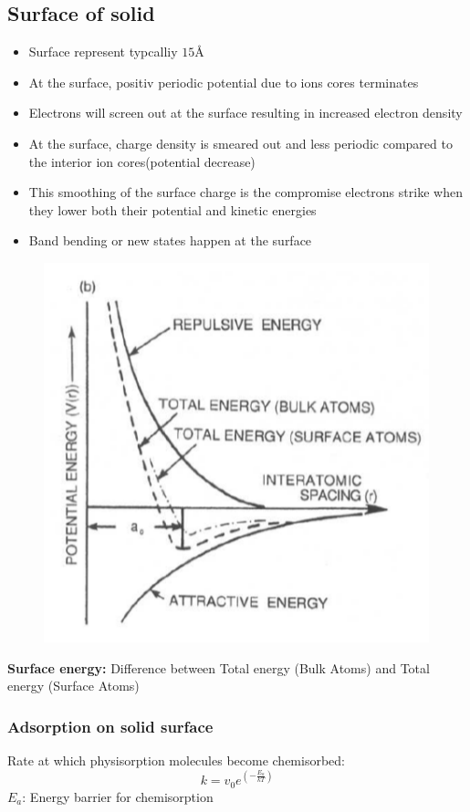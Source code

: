 \subsection{Surface of solid}
\begin{itemize}
    \item Surface represent typcalliy \(15\)\r{A}
    \item At the surface, positiv periodic potential due to ions cores terminates
    \item Electrons will screen out at the surface resulting in  increased electron density
    \item At the surface, charge density is smeared out and less periodic compared to the interior ion cores(potential decrease)
    \item This smoothing of the surface charge is the compromise electrons strike when they lower both their potential and kinetic energies
    \item Band bending or new states happen at the surface
\end{itemize}
\begin{figure}[h]
    \centering
    \includegraphics[width=0.7\columnwidth]{images/atombond.png}
    \label{fig:atombond}
\end{figure}
\textbf{Surface energy:} Difference between Total energy (Bulk Atoms) and Total energy (Surface Atoms)
\subsubsection{Adsorption on solid surface}
Rate at which physisorption molecules become chemisorbed:
\[
k = v_0 e^{\left(-\frac{E_a}{kT}\right)}
\]
\(E_a\): Energy barrier for chemisorption

